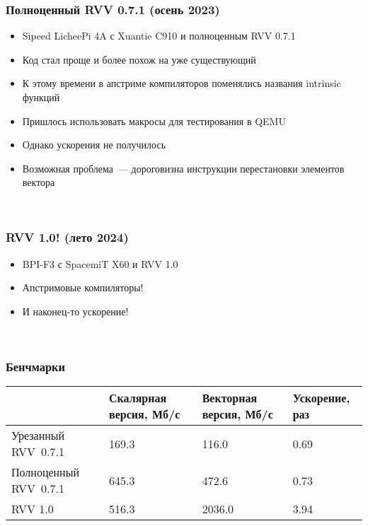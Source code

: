 \documentclass[
    aspectratio=169,
]{beamer}
\begin{document}
\begin{frame}
    \frametitle{Полноценный RVV 0.7.1 (осень 2023)}

    \begin{itemize}[<+->]
        \item Sipeed LicheePi 4A с Xuantie C910 и полноценным RVV 0.7.1
        \item Код стал проще и более похож на уже существующий
        \item К этому времени в апстриме компиляторов поменялись названия intrinsic функций
        \item Пришлось использовать макросы для тестирования в QEMU
        \item Однако ускорения не получилось
        \item Возможная проблема~--- дороговизна инструкции перестановки элементов вектора
    \end{itemize}

    \ %


\end{frame}

\begin{frame}
    \frametitle{RVV 1.0! (лето 2024)}

    \begin{itemize}[<+->]
        \item BPI-F3 с SpacemiT X60 и RVV 1.0
        \item Апстримовые компиляторы!
        \item И наконец-то ускорение!
    \end{itemize}

    \ %

\end{frame}

\begin{frame}
    \frametitle{Бенчмарки}

    \begin{center}
        \begin{tabularx}{\textwidth}{YZZZ}
            \toprule
                                  & Скалярная версия, Мб/с & Векторная версия, Мб/с & Ускорение, раз \\
            \midrule
            Урезанный RVV~0.7.1   & 169.3                  & 116.0                  & 0.69           \\
            \midrule
            Полноценный RVV~0.7.1 & 645.3                  & 472.6                  & 0.73           \\
            \midrule
            RVV 1.0               & 516.3                  & 2036.0                 & 3.94           \\
            \bottomrule
        \end{tabularx}
    \end{center}

\end{frame}
\end{document}
